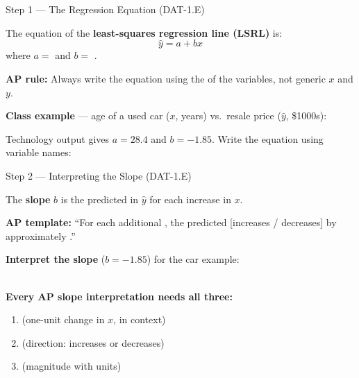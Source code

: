 \documentclass[10pt]{article}
\begin{document}
\begin{notesbox}{Step 1 --- The Regression Equation (DAT-1.E)}
\small

\noindent The equation of the \textbf{least-squares regression line (LSRL)} is:
\[
  \hat{y} = a + bx
\]
where \quad $a = $ \blank{5.5cm} \quad and \quad $b = $ \blank{5.5cm}.

\vspace{6pt}
\textbf{AP rule:} Always write the equation using the \blank{5cm} of the variables,
not generic $x$ and $y$.

\vspace{8pt}
\textbf{Class example} --- age of a used car ($x$, years) vs.\ resale price ($\hat{y}$, \$1000s):

\vspace{4pt}
Technology output gives $a = 28.4$ and $b = -1.85$. Write the equation using variable names:

\vspace{6pt}
\hspace{1.5cm} \blank{9cm}

\end{notesbox}

\vspace{0.1in}

\begin{notesbox}{Step 2 --- Interpreting the Slope (DAT-1.E)}
\small

\noindent The \textbf{slope} $b$ is the predicted \blank{4cm} in $\hat{y}$ for each
\blank{3cm} increase in $x$.

\vspace{6pt}
\textbf{AP template:} ``For each additional \blank{5cm}, the predicted
\blank{4.5cm} [increases / decreases] by approximately \blank{3cm}.''

\vspace{8pt}
\textbf{Interpret the slope} ($b = -1.85$) for the car example:
\vspace{4pt}\\
\writeline\\[2pt]\writeline

\vspace{6pt}
\textbf{Every AP slope interpretation needs all three:}
\begin{enumerate}[leftmargin=1.8em, itemsep=2pt]
  \item \blank{9cm} \hfill (one-unit change in $x$, in context)
  \item \blank{9cm} \hfill (direction: increases or decreases)
  \item \blank{9cm} \hfill (magnitude with units)
\end{enumerate}

\end{notesbox}
\end{document}
